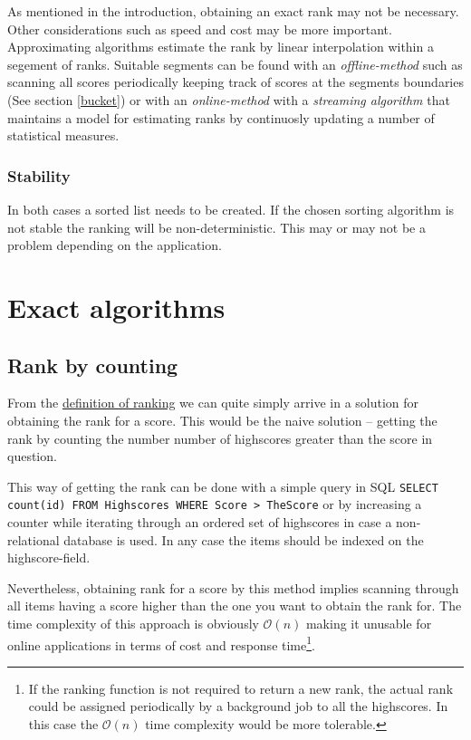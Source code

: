 As mentioned in the introduction, obtaining an exact rank may not be necessary. Other considerations such as speed and cost may be more important. Approximating algorithms estimate the rank by linear interpolation within a segement of ranks. Suitable segments can be found with an \emph{offline-method} such as scanning all scores periodically keeping track of scores at the segments boundaries (See section \ref{bucket}) or with an \emph{online-method} with a \emph{streaming algorithm} that maintains a model for estimating ranks by continuosly updating a number of statistical measures.

\subsubsection{Stability}

In both cases a sorted list needs to be created. If the chosen sorting algorithm is not stable the ranking will be non-deterministic. This may or may not be a problem depending on the application. 


\section{Exact algorithms}

\subsection{Rank by counting}

From the \hyperref[definition]{definition of ranking} we can quite simply arrive in a solution for obtaining the rank for a score. This would be the naive solution -- getting the rank by counting the number number of highscores greater than the score in question.

This way of getting the rank can be done with a simple query in SQL
\texttt{SELECT count(id) FROM Highscores WHERE Score > TheScore} or by increasing a counter while iterating through an ordered set of highscores in case a non-relational database is used. In any case the items should be indexed on the highscore-field.

Nevertheless, obtaining rank for a score by this method implies scanning through all items having a score higher than the one you want to obtain the rank for. The time complexity of this approach is obviously $\mathcal{O}(n)$ making it unusable for online applications in terms of cost and response time\footnote{If the ranking function is not required to return a new rank, the actual rank could be assigned periodically by a background job to all the highscores. In this case the $\mathcal{O}(n)$ time complexity would be more tolerable.}.

